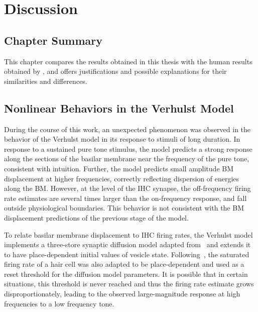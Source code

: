 \chapter{Discussion}
\label{chapter:Discussion}
\thispagestyle{myheadings}

\graphicspath{{6_Discussion/Figures/}}
\section{Chapter Summary} %
\label{sec:discussion_summary}
This chapter compares the results obtained in this thesis with the human results obtained by \cite{Mehraei2016Auditory}, and offers justifications and possible explanations for their similarities and differences.
\section{Nonlinear Behaviors in the Verhulst Model} %
\label{sec:nonlinear_behaviors_in_the_verhulst_model}
During the course of this work, an unexpected phenomenon was observed in the behavior of the Verhulst model in its response to stimuli of long duration.  In response to a sustained pure tone stimulus, the model predicts a strong response along the sections of the basilar membrane near the frequency of the pure tone, consistent with intuition. Further, the model predicts small amplitude BM displacement at higher frequencies, correctly reflecting dispersion of energies along the BM.  However, at the level of the IHC synapse, the off-frequency firing rate estimates are several times larger than the on-frequency response, and fall outside physiological boundaries. This behavior is not consistent with the BM displacement predictions of the previous stage of the model.  

To relate basilar membrane displacement to IHC firing rates, the Verhulst model implements a three-store synaptic diffusion model adapted from~\cite{Westerman1988Diffusion} and extends it to have place-dependent initial values of vesicle state.   Following~\cite{Liberman1978AuditoryNerve}, the saturated firing rate of a hair cell was also adapted to be place-dependent and used as a reset threshold for the diffusion model parameters.  It is possible that in certain situations, this threshold is never reached and thus the firing rate estimate grows disproportionately, leading to the observed large-magnitude response at high frequencies to a low frequency tone.


